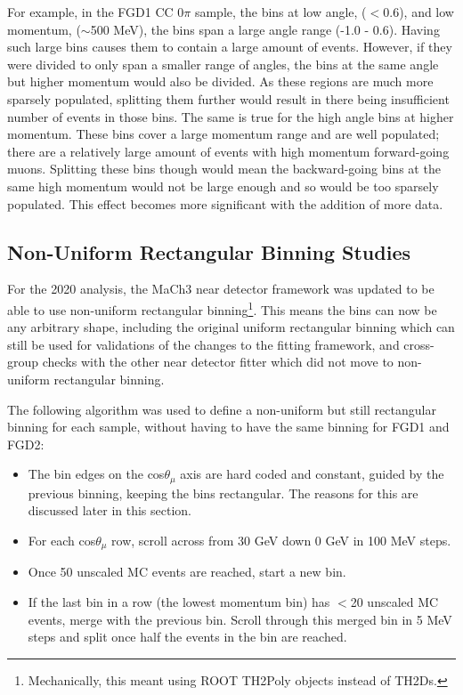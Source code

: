 For example, in the FGD1 CC 0$\pi$ sample, the bins at low angle, ($<0.6$), and low momentum, ($\sim$500 MeV), the bins span a large angle range (-1.0 - 0.6). Having such large bins causes them to contain a large amount of events. However, if they were divided to only span a smaller range of angles, the bins at the same angle but higher momentum would also be divided. As these regions are much more sparsely populated, splitting them further would result in there being insufficient number of events in those bins. The same is true for the high angle bins at higher momentum. These bins cover a large momentum range and are well populated; there are a relatively large amount of events with high momentum forward-going muons. Splitting these bins though would mean the backward-going bins at the same high momentum would not be large enough and so would be too sparsely populated. This effect becomes more significant with the addition of more data.

\subsection{Non-Uniform Rectangular Binning Studies}\label{sec:nonrecbinning}
\enlargethispage{\baselineskip}
For the 2020 analysis, the MaCh3 near detector framework was updated to be able to use non-uniform rectangular binning\footnote{Mechanically, this meant using ROOT\cite{root} TH2Poly objects instead of TH2Ds.}. This means the bins can now be any arbitrary shape, including the original uniform rectangular binning which can still be used for validations of the changes to the fitting framework, and cross-group checks with the other near detector fitter which did not move to non-uniform rectangular binning.

The following algorithm was used to define a non-uniform but still rectangular binning for each sample, without having to have the same binning for FGD1 and FGD2:

\begin{itemize}

\item The bin edges on the cos$\theta_{\mu}$ axis are hard coded and constant, guided by the previous binning, keeping the bins rectangular. The reasons for this are discussed later in this section.

\item For each cos$\theta_{\mu}$ row, scroll across from 30 GeV down 0 GeV in 100 MeV steps.

\item Once 50 unscaled MC events are reached, start a new bin.

\item If the last bin in a row (the lowest momentum bin) has $<$20 unscaled MC events, merge with the previous bin. Scroll through this merged bin in 5 MeV steps and split once half the events in the bin are reached.

\end{itemize}

